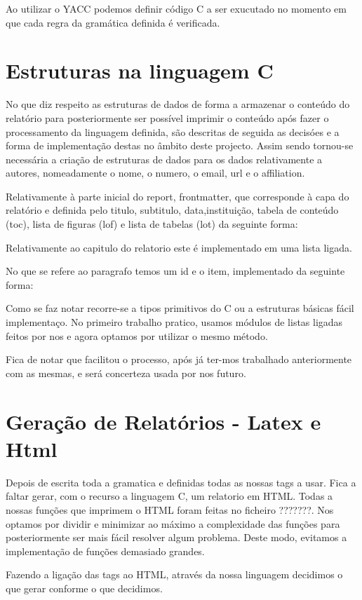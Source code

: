 \documentclass[12pt,letterpaper]{article}
\begin{document}
Ao utilizar o YACC podemos definir código C a ser exucutado no momento em que cada regra da gramática definida é verificada. 

\newpage
\section{Estruturas na linguagem C}
No que diz respeito as estruturas de dados de forma a armazenar o conteúdo do relatório para posteriormente ser possível imprimir o conteúdo após fazer o processamento da linguagem definida, são descritas de seguida as decisóes e a forma de implementação destas no âmbito deste projecto. Assim sendo tornou-se necessária a criação de estruturas de dados para os dados relativamente a autores, nomeadamente o nome, o numero, o email, url e o affiliation.

Relativamente à parte inicial do report, frontmatter, que corresponde à capa do relatório e definida pelo titulo, subtitulo, data,instituição, tabela de conteúdo (toc), lista de figuras (lof) e lista de tabelas (lot) da seguinte forma:

Relativamente ao capitulo do relatorio este é implementado em uma lista ligada.

No que se refere ao paragrafo temos um id e o item, implementado da seguinte forma:

Como se faz notar recorre-se a tipos primitivos do C ou a estruturas básicas fácil implementaço. No primeiro trabalho pratico, usamos módulos de listas ligadas feitos por nos e agora optamos por utilizar o mesmo método.

Fica de notar que facilitou o processo, após já ter-mos trabalhado anteriormente com as mesmas, e será concerteza usada por nos futuro.

\newpage
\section{Geração de Relatórios - Latex e Html}
Depois de escrita toda a gramatica e definidas todas as nossas tags a usar. Fica a faltar gerar, com o recurso a linguagem C, um relatorio em HTML. Todas a nossas funções que imprimem o HTML foram feitas no ficheiro ???????. Nos optamos por dividir e minimizar ao máximo a complexidade das funções para posteriormente ser mais fácil resolver algum problema. Deste modo, evitamos a implementação de funções demasiado grandes.

Fazendo a ligação das tags ao HTML, através da nossa linguagem decidimos o que gerar conforme o que decidimos.
\end{document}
